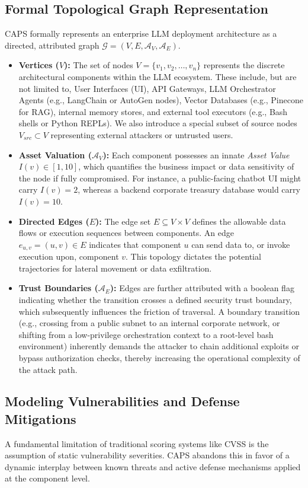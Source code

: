 \subsection{Formal Topological Graph Representation}
CAPS formally represents an enterprise LLM deployment architecture as a directed, attributed graph $\mathcal{G} = (V, E, \mathcal{A}_V, \mathcal{A}_E)$. 

\begin{itemize}
    \item \textbf{Vertices ($V$):} The set of nodes $V = \{v_1, v_2, \dots, v_n\}$ represents the discrete architectural components within the LLM ecosystem. These include, but are not limited to, User Interfaces (UI), API Gateways, LLM Orchestrator Agents (e.g., LangChain or AutoGen nodes), Vector Databases (e.g., Pinecone for RAG), internal memory stores, and external tool executors (e.g., Bash shells or Python REPLs). We also introduce a special subset of source nodes $V_{src} \subset V$ representing external attackers or untrusted users.
    \item \textbf{Asset Valuation ($\mathcal{A}_V$):} Each component possesses an innate \textit{Asset Value} $I(v) \in [1, 10]$, which quantifies the business impact or data sensitivity of the node if fully compromised. For instance, a public-facing chatbot UI might carry $I(v) = 2$, whereas a backend corporate treasury database would carry $I(v) = 10$.
    \item \textbf{Directed Edges ($E$):} The edge set $E \subseteq V \times V$ defines the allowable data flows or execution sequences between components. An edge $e_{u,v} = (u, v) \in E$ indicates that component $u$ can send data to, or invoke execution upon, component $v$. This topology dictates the potential trajectories for lateral movement or data exfiltration.
    \item \textbf{Trust Boundaries ($\mathcal{A}_E$):} Edges are further attributed with a boolean flag indicating whether the transition crosses a defined security trust boundary, which subsequently influences the friction of traversal. A boundary transition (e.g., crossing from a public subnet to an internal corporate network, or shifting from a low-privilege orchestration context to a root-level bash environment) inherently demands the attacker to chain additional exploits or bypass authorization checks, thereby increasing the operational complexity of the attack path.
\end{itemize}

\subsection{Modeling Vulnerabilities and Defense Mitigations}
A fundamental limitation of traditional scoring systems like CVSS is the assumption of static vulnerability severities. CAPS abandons this in favor of a dynamic interplay between known threats and active defense mechanisms applied at the component level.

